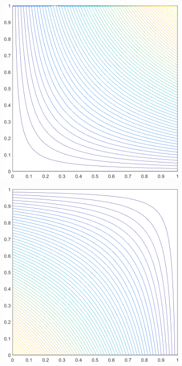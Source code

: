 \begin{figure}
\begin{subfigure}[b]{0.39\textwidth}
		\caption{}
	\end{subfigure}
	\hspace{1.5cm}
	\begin{subfigure}[b]{0.39\textwidth}
		\centering
		\includegraphics[width=\textwidth]{figures/sec_BF/deg_square_WACHSPRESS1_contour_b3.png}
		\caption{}
	\end{subfigure}
	\vfill
	\begin{subfigure}[b]{0.39\textwidth}
		\centering
		\includegraphics[width=\textwidth]{figures/sec_BF/deg_square_WACHSPRESS1_contour_b1.png}

\end{subfigure}
\end{figure}
